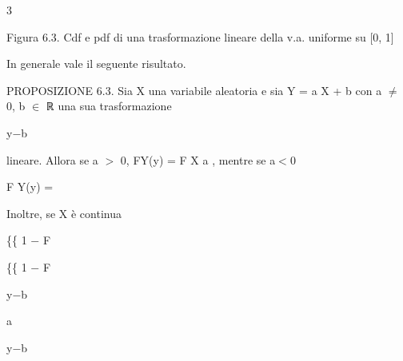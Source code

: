 \documentclass[a4paper,portrait,12pt]{article}
\begin{document}
3





\begin{flushleft}
Figura 6.3. Cdf e pdf di una trasformazione lineare della v.a. uniforme su [0, 1]
\end{flushleft}





\begin{flushleft}
In generale vale il seguente risultato.
\end{flushleft}


\begin{flushleft}
PROPOSIZIONE 6.3. Sia X una variabile aleatoria e sia Y = a X + b con a $\neq$ 0, b $\in$ ℝ una sua trasformazione
\end{flushleft}


\begin{flushleft}
y$-$b
\end{flushleft}


\begin{flushleft}
lineare. Allora se a $>$ 0, FY(y) = F X a , mentre se a$<$0
\end{flushleft}


\begin{flushleft}
F Y(y) =
\end{flushleft}


\begin{flushleft}
Inoltre, se X \`{e} continua
\end{flushleft}





\begin{flushleft}
\{\{ 1 $-$ F
\end{flushleft}


\begin{flushleft}
\{\{ 1 $-$ F
\end{flushleft}





\begin{flushleft}
y$-$b
\end{flushleft}


\begin{flushleft}
a
\end{flushleft}


\begin{flushleft}
y$-$b
\end{flushleft}
\end{document}
